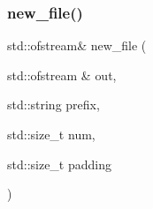 \mbox{\label{irk-part_8cpp_ac847d7f963015a5fe6bcc99b24a2f5b4}} 
\subsubsection{\texorpdfstring{new\+\_\+file()}{new\_file()}}
{\footnotesize\ttfamily std\+::ofstream\& new\+\_\+file (\begin{DoxyParamCaption}\item[{std\+::ofstream \&}]{out,  }\item[{std\+::string}]{prefix,  }\item[{std\+::size\+\_\+t}]{num,  }\item[{std\+::size\+\_\+t}]{padding }\end{DoxyParamCaption})}

